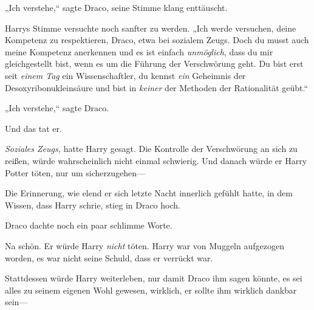 „Ich verstehe,“ sagte Draco, seine Stimme klang enttäuscht.

Harrys Stimme versuchte noch sanfter zu werden. „Ich werde versuchen, deine Kompetenz zu respektieren, Draco, etwa bei sozialem Zeugs. Doch du musst auch meine Kompetenz anerkennen und es ist einfach \emph{unmöglich}, dass du mir gleichgestellt bist, wenn es um die Führung der Verschwörung geht. Du bist erst seit \emph{einem Tag} ein Wissenschaftler, du kennst \emph{ein} Geheimnis der Desoxyribonukleinsäure und bist in \emph{keiner} der Methoden der Rationalität geübt.“

„Ich verstehe,“ sagte Draco.

Und das tat er.

\emph{Soziales Zeugs,} hatte Harry gesagt. Die Kontrolle der Verschwörung an sich zu reißen, würde wahrscheinlich nicht einmal schwierig. Und danach würde er Harry Potter töten, nur um sicherzugehen—

Die Erinnerung, wie elend er sich letzte Nacht innerlich gefühlt hatte, in dem Wissen, dass Harry schrie, stieg in Draco hoch.

Draco dachte noch ein paar schlimme Worte.

Na schön. Er würde Harry \emph{nicht} töten. Harry war von Muggeln aufgezogen worden, es war nicht seine Schuld, dass er verrückt war.

Stattdessen würde Harry weiterleben, nur damit Draco ihm sagen könnte, es sei alles zu seinem eigenen Wohl gewesen, wirklich, er sollte ihm wirklich dankbar sein—

